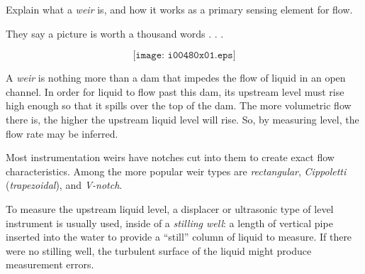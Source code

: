 

Explain what a {\it weir} is, and how it works as a primary sensing element for flow.







They say a picture is worth a thousand words . . .

$$\texttt{[image: i00480x01.eps]}$$

A {\it weir} is nothing more than a dam that impedes the flow of liquid in an open channel.  In order for liquid to flow past this dam, its upstream level must rise high enough so that it spills over the top of the dam.  The more volumetric flow there is, the higher the upstream liquid level will rise.  So, by measuring level, the flow rate may be inferred.

Most instrumentation weirs have notches cut into them to create exact flow characteristics.  Among the more popular weir types are {\it rectangular}, {\it Cippoletti} ({\it trapezoidal}), and {\it V-notch}.

To measure the upstream liquid level, a displacer or ultrasonic type of level instrument is usually used, inside of a {\it stilling well}: a length of vertical pipe inserted into the water to provide a ``still'' column of liquid to measure.  If there were no stilling well, the turbulent surface of the liquid might produce measurement errors.











